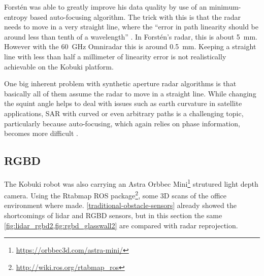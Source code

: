 Forstén was able to greatly improve his data quality by use of an minimum-entropy based auto-focusing algorithm. The trick with this is that the radar needs to move in a very straight line, where the ``error in path linearity should be around less than tenth of a wavelength'' \cite{Forsten2015}. In Forstén's radar, this is about \SI{5}{mm}. However with the \SI{60}{GHz} Omniradar this is around \SI{0.5}{mm}. Keeping a straight line with less than half a millimeter of linearity error is not realistically achievable on the Kobuki platform.

One big inherent problem with synthetic aperture radar algorithms is
that basically all of them assume the radar to move in a straight line.
While changing the squint angle helps to deal with issues such as earth
curvature in satellite applications, SAR with curved or even arbitrary
paths is a challenging topic, particularly because auto-focusing, which
again relies on phase information, becomes more difficult
\cite{Axelsson2002}.

\subsection{RGBD}\label{rgbd-1}
The Kobuki robot was also carrying an Astra Orbbec Mini\footnote{\url{https://orbbec3d.com/astra-mini/}} strutured light depth camera. Using the Rtabmap \cite{Labbe2014} ROS package\footnote{\url{http://wiki.ros.org/rtabmap_ros}}, some 3D scans of the office environment where made. \cref{traditional-obstacle-sensors} already showed the shortcomings of lidar and RGBD sensors, but in this section the same \cref{fig:lidar_rgbd2,fig:rgbd_glasswall2} are compared with radar reprojection.

